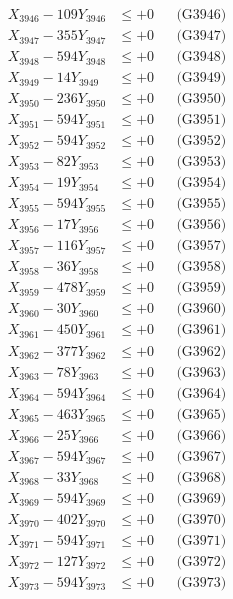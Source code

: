 \documentclass[a4paper,10pt]{article}
\begin{document}
{\begin{align}
X_{3946} - 109Y_{3946} &\leq +0 && \text{(G3946)} \\
X_{3947} - 355Y_{3947} &\leq +0 && \text{(G3947)} \\
X_{3948} - 594Y_{3948} &\leq +0 && \text{(G3948)} \\
X_{3949} - 14Y_{3949} &\leq +0 && \text{(G3949)} \\
X_{3950} - 236Y_{3950} &\leq +0 && \text{(G3950)} \\
\allowbreak
X_{3951} - 594Y_{3951} &\leq +0 && \text{(G3951)} \\
X_{3952} - 594Y_{3952} &\leq +0 && \text{(G3952)} \\
X_{3953} - 82Y_{3953} &\leq +0 && \text{(G3953)} \\
X_{3954} - 19Y_{3954} &\leq +0 && \text{(G3954)} \\
X_{3955} - 594Y_{3955} &\leq +0 && \text{(G3955)} \\
X_{3956} - 17Y_{3956} &\leq +0 && \text{(G3956)} \\
X_{3957} - 116Y_{3957} &\leq +0 && \text{(G3957)} \\
X_{3958} - 36Y_{3958} &\leq +0 && \text{(G3958)} \\
X_{3959} - 478Y_{3959} &\leq +0 && \text{(G3959)} \\
X_{3960} - 30Y_{3960} &\leq +0 && \text{(G3960)} \\
\allowbreak
X_{3961} - 450Y_{3961} &\leq +0 && \text{(G3961)} \\
X_{3962} - 377Y_{3962} &\leq +0 && \text{(G3962)} \\
X_{3963} - 78Y_{3963} &\leq +0 && \text{(G3963)} \\
X_{3964} - 594Y_{3964} &\leq +0 && \text{(G3964)} \\
X_{3965} - 463Y_{3965} &\leq +0 && \text{(G3965)} \\
X_{3966} - 25Y_{3966} &\leq +0 && \text{(G3966)} \\
X_{3967} - 594Y_{3967} &\leq +0 && \text{(G3967)} \\
X_{3968} - 33Y_{3968} &\leq +0 && \text{(G3968)} \\
X_{3969} - 594Y_{3969} &\leq +0 && \text{(G3969)} \\
X_{3970} - 402Y_{3970} &\leq +0 && \text{(G3970)} \\
\allowbreak
X_{3971} - 594Y_{3971} &\leq +0 && \text{(G3971)} \\
X_{3972} - 127Y_{3972} &\leq +0 && \text{(G3972)} \\
X_{3973} - 594Y_{3973} &\leq +0 && \text{(G3973)} \\

\end{align}}
\end{document}
